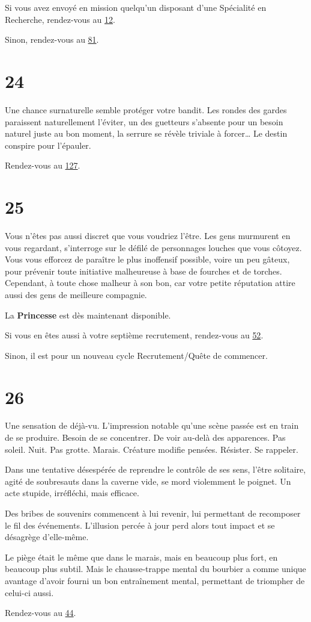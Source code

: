 \documentclass{report}
\newcommand{\gsection}[1]{
    \section{#1}
    \label{section-#1}
}
\newcommand{\glink}[1]{\hyperref[section-#1]{#1}}
\newcommand{\hero}[1]{
    \textbf{#1}
}
\begin{document}
Si vous avez envoyé en mission quelqu'un disposant d'une Spécialité en Recherche, rendez-vous au \glink{12}.

Sinon, rendez-vous au \glink{81}.

\gsection{24}

Une chance surnaturelle semble protéger votre bandit. Les rondes des gardes paraissent naturellement l'éviter, un des guetteurs s'absente pour un besoin naturel juste au bon moment, la serrure se révèle triviale à forcer… Le destin conspire pour l'épauler.

Rendez-vous au \glink{127}.

\gsection{25}

Vous n'êtes pas aussi discret que vous voudriez l'être. Les gens murmurent en vous regardant, s'interroge sur le défilé de personnages louches que vous côtoyez. Vous vous efforcez de paraître le plus inoffensif possible, voire un peu gâteux, pour prévenir toute initiative malheureuse à base de fourches et de torches.
Cependant, à toute chose malheur à son bon, car votre petite réputation attire aussi des gens de meilleure compagnie.

La \hero{Princesse} est dès maintenant disponible.

Si vous en êtes aussi à votre septième recrutement, rendez-vous au \glink{52}.

Sinon, il est pour un nouveau cycle Recrutement/Quête de commencer.

\gsection{26}

Une sensation de déjà-vu. L'impression notable qu'une scène passée est en train de se produire. Besoin de se concentrer. De voir au-delà des apparences. Pas soleil. Nuit. Pas grotte. Marais. Créature modifie pensées. Résister. Se rappeler.

Dans une tentative désespérée de reprendre le contrôle de ses sens, l'être solitaire, agité de soubresauts dans la caverne vide, se mord violemment le poignet. Un acte stupide, irréfléchi, mais efficace.

Des bribes de souvenirs commencent à lui revenir, lui permettant de recomposer le fil des événements. L'illusion percée à jour perd alors tout impact et se désagrège d'elle-même.

Le piège était le même que dans le marais, mais en beaucoup plus fort, en beaucoup plus subtil. Mais le chausse-trappe mental du bourbier a comme unique avantage d'avoir fourni un bon entraînement mental, permettant de triompher de celui-ci aussi.

Rendez-vous au \glink{44}.
\end{document}
